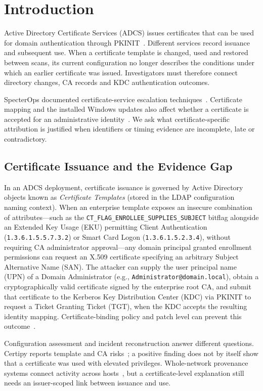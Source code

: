 \section{Introduction}
\label{sec:introduction}

Active Directory Certificate Services (ADCS) issues certificates that can be used for domain authentication through PKINIT~\cite{rfc4556}. Different services record issuance and subsequent use. When a certificate template is changed, used and restored between scans, its current configuration no longer describes the conditions under which an earlier certificate was issued. Investigators must therefore connect directory changes, CA records and KDC authentication outcomes.

SpecterOps documented certificate-service escalation techniques~\cite{schroeder2021certified}. Certificate mapping and the installed Windows updates also affect whether a certificate is accepted for an administrative identity~\cite{microsoft2025strongbinding}. We ask what certificate-specific attribution is justified when identifiers or timing evidence are incomplete, late or contradictory.

\subsection{Certificate Issuance and the Evidence Gap}
In an ADCS deployment, certificate issuance is governed by Active Directory objects known as \textit{Certificate Templates} (stored in the LDAP configuration naming context). When an enterprise template exposes an insecure combination of attributes—such as the \texttt{CT\_FLAG\_ENROLLEE\_SUPPLIES\_SUBJECT} bitflag alongside an Extended Key Usage (EKU) permitting Client Authentication (\texttt{1.3.6.1.5.5.7.3.2}) or Smart Card Logon (\texttt{1.3.6.1.5.2.3.4}), without requiring CA administrator approval—any domain principal granted enrollment permissions can request an X.509 certificate specifying an arbitrary Subject Alternative Name (SAN). The attacker can supply the user principal name (UPN) of a Domain Administrator (e.g., \texttt{Administrator@domain.local}), obtain a cryptographically valid certificate signed by the enterprise root CA, and submit that certificate to the Kerberos Key Distribution Center (KDC) via PKINIT to request a Ticket Granting Ticket (TGT), when the KDC accepts the resulting identity mapping. Certificate-binding policy and patch level can prevent this outcome~\cite{microsoft2025strongbinding}.

Configuration assessment and incident reconstruction answer different questions. Certipy reports template and CA risks~\cite{lyak2021certipy}; a positive finding does not by itself show that a certificate was used with elevated privileges. Whole-network provenance systems connect activity across hosts~\cite{liu2026hades,liu2026cpd}, but a certificate-level explanation still needs an issuer-scoped link between issuance and use.

